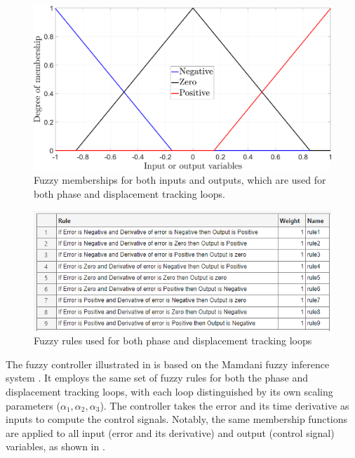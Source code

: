 \documentclass[preprint,12pt]{elsarticle}
\begin{document}
\begin{figure}
    \centering    \includegraphics[width=\linewidth]{F_membership.png}
    \caption{Fuzzy memberships for both inputs and outputs, which are used for both phase and displacement tracking loops.}
    \label{F_fuzzy_memberships}
\end{figure}


\begin{figure}
    \centering    \includegraphics[width=\linewidth]{Fuzzy_rules.png}
    \caption{Fuzzy rules used for both phase and displacement tracking loops}
    \label{F_fuzzy_rules}
\end{figure}

The fuzzy controller illustrated in  is based on the Mamdani fuzzy inference system \cite{Ross2010}. It employs the same set of fuzzy rules for both the phase and displacement tracking loops, with each loop distinguished by its own scaling parameters ($\alpha_1, \alpha_2, \alpha_3$). The controller takes the error and its time derivative as inputs to compute the control signals. Notably, the same membership functions are applied to all input (error and its derivative) and output (control signal) variables, as shown in .
\end{document}
